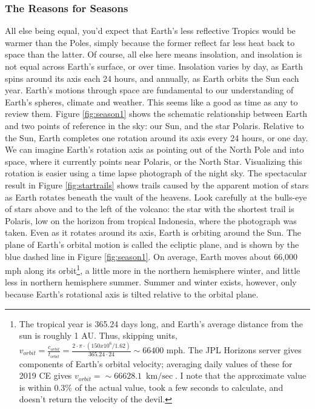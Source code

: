 \subsubsection{The Reasons for Seasons}
All else being equal, you'd expect that Earth's less reflective Tropics would be warmer than the Poles, simply because the former reflect far less heat back to space than the latter. Of course, all else here means insolation, and insolation is not equal across Earth's surface, or over time. Insolation varies by day, as Earth spins around its axis each 24 hours, and annually, as Earth orbits the Sun each year. Earth's motions through space are fundamental to our understanding of Earth's spheres, climate and weather. This seems like a good as time as any to review them. Figure \ref{fig:season1} shows the schematic relationship between Earth and two points of reference in the sky: our Sun, and the star Polaris. Relative to the Sun, Earth completes one rotation around its axis every 24 hours, or one day. We can imagine Earth's rotation axis as pointing out of the North Pole and into space, where it currently points near Polaris, or the North Star. Visualizing this rotation is easier using a time lapse photograph of the night sky. The spectacular result in Figure \ref{fig:startrails} shows trails caused by the apparent motion of stars as Earth rotates beneath the vault of the heavens. Look carefully at the bulls-eye of stars above and to the left of the volcano: the star with the shortest trail is Polaris, low on the horizon from tropical Indonesia, where the photograph was taken. Even as it rotates around its axis, Earth is orbiting around the Sun. The plane of Earth's orbital motion is called the ecliptic plane, and is shown by the blue dashed line in Figure \ref{fig:season1}. On average, Earth moves about 66,000 mph along its orbit\footnote{The tropical year is 365.24 days long, and Earth's average distance from the sun is roughly 1 AU. Thus, skipping units, $v_{orbit}=\frac{c_{orbit}}{t_{orbit}}=\frac{2\cdot\pi\cdot(150x10^6/1.62)}{365.24\cdot24}\sim 66400$ mph. The JPL Horizons server gives components of Earth's orbital velocity; averaging daily values of these for 2019 CE gives  $v_{orbit}=\sim\SI{66628.1}{\kilo\metre\per\sec}$. I note that the approximate value is within 0.3\% of the actual value, took a few seconds to calculate, and doesn't return the velocity of the devil.}, a little more in the northern hemisphere winter, and little less in northern hemisphere summer. Summer and winter exists, however, only because Earth's rotational axis is tilted relative to the orbital plane.
